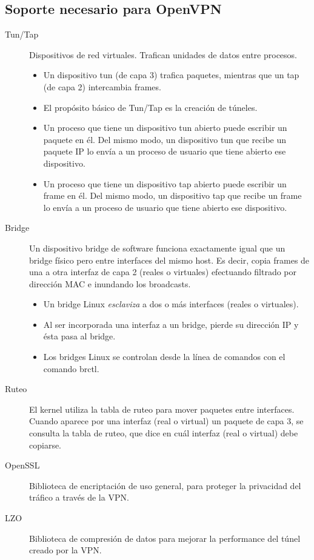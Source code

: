 \subsection{Soporte necesario para OpenVPN}
\begin{description}
	\item [Tun/Tap] Dispositivos de red virtuales. Trafican unidades de datos entre procesos. 
	\begin{itemize}
		\item Un dispositivo tun (de capa 3) trafica paquetes, mientras que un tap (de capa 2) intercambia frames. 
		\item El propósito básico de Tun/Tap es la creación de túneles.
		\item Un proceso que tiene un dispositivo tun abierto puede escribir un paquete en él.  Del mismo modo, un dispositivo tun que recibe un paquete IP lo envía a un proceso de usuario que tiene abierto ese dispositivo.
		\item Un proceso que tiene un dispositivo tap abierto puede escribir un frame en él.  Del mismo modo, un dispositivo tap que recibe un frame lo envía a un proceso de usuario que tiene abierto ese dispositivo.
	\end{itemize}
	\item [Bridge] Un dispositivo bridge de software funciona exactamente igual que un bridge físico pero entre interfaces del mismo host. Es decir, copia frames de una a otra interfaz de capa 2 (reales o virtuales) efectuando filtrado por dirección MAC e inundando los broadcasts.
	\begin{itemize}
		\item Un bridge Linux \emph{esclaviza} a dos o más interfaces (reales o virtuales).
		\item Al ser incorporada una interfaz a un bridge, pierde su dirección IP y ésta pasa al bridge. 
		\item Los bridges Linux se controlan desde la línea de comandos con el comando brctl.
\end{itemize}
	\item[Ruteo] El kernel utiliza la tabla de ruteo para mover paquetes entre interfaces. Cuando aparece por una interfaz (real o virtual) un paquete de capa 3, se consulta la tabla de ruteo, que dice en cuál interfaz (real o virtual) debe copiarse.  
	\item [OpenSSL] Biblioteca de encriptación de uso general, para proteger la privacidad del tráfico a través de la VPN.
	\item [LZO] Biblioteca de compresión de datos para mejorar la performance del túnel creado por la VPN.
\end{description}



